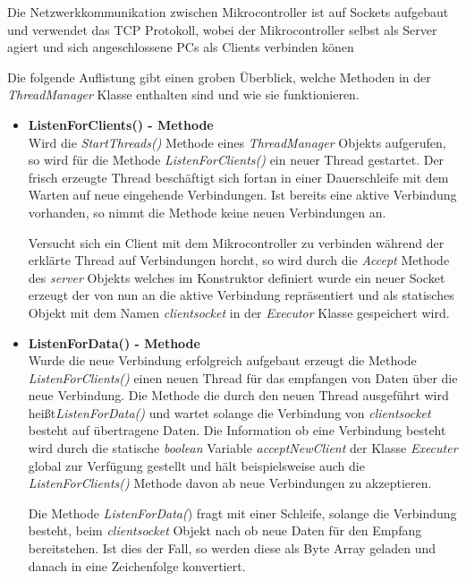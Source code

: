Die Netzwerkkommunikation zwischen Mikrocontroller ist auf Sockets aufgebaut und verwendet das TCP Protokoll, wobei der Mikrocontroller selbst als Server agiert und sich angeschlossene PCs als Clients verbinden könen

Die folgende Auflistung gibt einen groben Überblick, welche Methoden in der \textit{ThreadManager} Klasse enthalten sind und wie sie funktionieren.

\begin{itemize}
\item \textbf{ListenForClients() - Methode}\\
Wird die \textit{StartThreads()} Methode eines \textit{ThreadManager} Objekts aufgerufen, so wird für die Methode \textit{ListenForClients()} ein neuer Thread gestartet. Der frisch erzeugte Thread beschäftigt sich fortan in einer Dauerschleife mit dem Warten auf neue eingehende Verbindungen. Ist bereits eine aktive Verbindung vorhanden, so nimmt die Methode keine neuen Verbindungen an.

Versucht sich ein Client mit dem Mikrocontroller zu verbinden während der erklärte Thread auf Verbindungen horcht, so wird durch die \textit{Accept} Methode des \textit{server} Objekts welches im Konstruktor definiert wurde ein neuer Socket erzeugt der von nun an die aktive Verbindung repräsentiert und als statisches Objekt mit dem Namen \textit{clientsocket} in der \textit{Executor} Klasse gespeichert wird.

\item \textbf{ListenForData() - Methode}\\
Wurde die neue Verbindung erfolgreich aufgebaut erzeugt die Methode \textit{ListenForClients()} einen neuen Thread für das empfangen von Daten über die neue Verbindung. Die Methode die durch den neuen Thread ausgeführt wird heißt\textit{ListenForData()} und wartet solange die Verbindung von \textit{clientsocket} besteht auf übertragene Daten. 
Die Information ob eine Verbindung besteht wird durch die statische \textit{boolean} Variable \textit{acceptNewClient} der Klasse \textit{Executer} global zur Verfügung gestellt und hält beispielsweise auch die \textit{ListenForClients()} Methode davon ab neue Verbindungen zu akzeptieren.

Die Methode \textit{ListenForData(}) fragt mit einer Schleife, solange die Verbindung besteht, beim  \textit{clientsocket} Objekt nach ob neue Daten für den Empfang bereitstehen. Ist dies der Fall, so werden diese als Byte Array geladen und danach in eine Zeichenfolge konvertiert.


\end{itemize}
